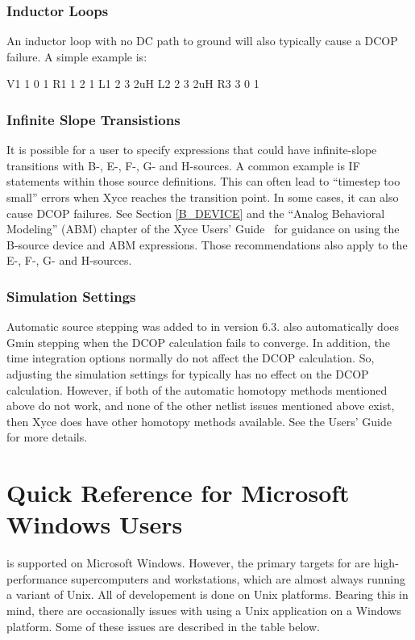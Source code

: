 \subsection{Inductor Loops}
An inductor loop with no DC path to ground will also typically cause a DCOP
failure.  A simple example is:
\begin{vquote}
V1 1 0 1
R1 1 2 1
L1 2 3 2uH
L2 2 3 2uH
R3 3 0 1
\end{vquote}

\subsection{Infinite Slope Transistions}
It is possible for a user to specify expressions that could have infinite-slope 
transitions with B-, E-, F-, G- and H-sources. A common example is IF statements
within those source definitions.  This can often lead to ``timestep too  small''
errors when Xyce reaches the transition point.  In some cases, it can also cause 
DCOP failures.  See Section \ref{B_DEVICE} and the ``Analog Behavioral Modeling'' 
(ABM) chapter of the Xyce Users' Guide~\UsersGuide{} for guidance on using the B-source device 
and ABM expressions.  Those recommendations also apply to the E-, F-, G- 
and H-sources.

\subsection{Simulation Settings}
Automatic source stepping was added to \Xyce{} in version 6.3.  \Xyce{} also automatically 
does Gmin stepping when the DCOP calculation fails to converge.  In addition, the time 
integration options normally do not affect the DCOP calculation.  So, adjusting the simulation
settings for \Xyce{} typically has no effect on the DCOP calculation.  However, if both of
the automatic homotopy methods mentioned above do not work, and none of the other
netlist issues mentioned above exist, then Xyce does have other homotopy methods 
available. See the \Xyce{} Users' Guide~\UsersGuide{} for more details.

\cleardoublepage

\chapter{Quick Reference for Microsoft Windows Users}
\label{Windows_Ref}

\Xyce{} is supported on Microsoft Windows.  However, the primary targets
for \Xyce{} are high-performance supercomputers and workstations, which
are almost always running a variant of Unix.  All of \Xyce{} 
developement is done on Unix platforms.  Bearing this in mind, there are
occasionally issues with using a Unix application on a Windows platform.
Some of these issues are described in the table below.




